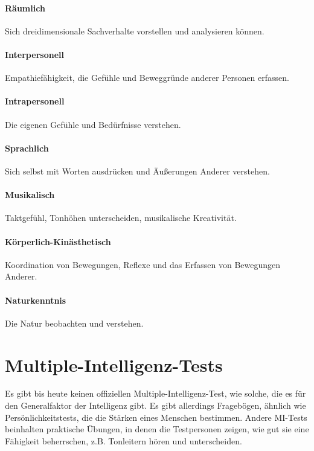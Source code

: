 \paragraph{Räumlich}
Sich dreidimensionale Sachverhalte vorstellen und analysieren können.
\paragraph{Interpersonell}
Empathiefähigkeit, die Gefühle und Beweggründe anderer Personen erfassen.
\paragraph{Intrapersonell}
Die eigenen Gefühle und Bedürfnisse verstehen.
\paragraph{Sprachlich}
Sich selbst mit Worten ausdrücken und Äußerungen Anderer verstehen.
\paragraph{Musikalisch}
Taktgefühl, Tonhöhen unterscheiden, musikalische Kreativität.
\paragraph{Körperlich-Kinästhetisch}
Koordination von Bewegungen, Reflexe und das Erfassen von Bewegungen Anderer.
\paragraph{Naturkenntnis}
Die Natur beobachten und verstehen.

\section{Multiple-Intelligenz-Tests}
Es gibt bis heute keinen offiziellen Multiple-Intelligenz-Test, wie solche, die es für den Generalfaktor der Intelligenz gibt. Es gibt allerdings Fragebögen, ähnlich wie Persönlichkeitstests, die die \glqq Stärken\grqq{} eines Menschen bestimmen. Andere MI-Tests beinhalten praktische Übungen, in denen die Testpersonen zeigen, wie gut sie eine Fähigkeit beherrschen, z.B. Tonleitern hören und unterscheiden. \cite{mi_tests}

